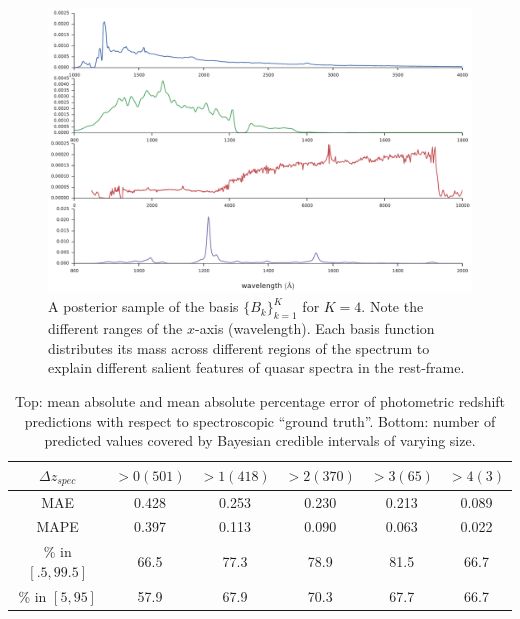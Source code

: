 \documentclass{article}
\begin{document}
\begin{figure}[t]
\vskip 0.2in
\begin{center}
\centerline{\includegraphics[width=2\columnwidth]{../figs/basis_samp_K_4}}
\vskip -0.2in
\caption{A posterior sample of the basis $\{ B_k \}_{k=1}^K$ for $K=4$.  Note the different ranges of the $x$-axis (wavelength).  Each basis function distributes its mass across different regions of the spectrum to explain different salient features of quasar spectra in the rest-frame. }
\label{fig:basis}
\end{center}
\end{figure}

\begin{table}[ht]
\caption{Top: mean absolute and mean absolute percentage error of photometric redshift predictions with respect to spectroscopic ``ground truth''.  Bottom: number of predicted values covered by Bayesian credible intervals of varying size. }
\label{tab:error}
\vskip 0.15in
\begin{center}
\begin{small}
\begin{sc}
\begin{tabular*}{0.75\textwidth}{cccccc}
\hline
\abovespace\belowspace
  $\Delta z_{spec}$ &  $ > 0 (501)$ & $ > 1 (418)$ & $ > 2 (370)$ & $ > 3 (65)$ & $ > 4 (3)$ \\
\hline
\abovespace
MAE &  0.428 & 0.253 & 0.230 & 0.213 & 0.089 \\
MAPE &  0.397 & 0.113 & 0.090 & 0.063 & 0.022 \\
\hline
\% in $[.5, 99.5]$ &  66.5 & 77.3 & 78.9 & 81.5 & 66.7 \\
\% in $[5, 95]$    &  57.9 & 67.9 & 70.3 & 67.7 & 66.7 \\
\hline
\end{tabular*}
\end{sc}
\end{small}
\end{center}
\vskip -0.1in
\end{table}
\end{document}
